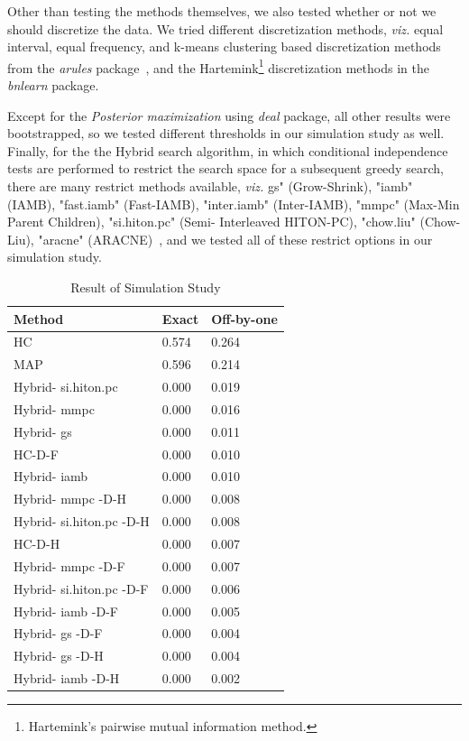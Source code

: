 \documentclass[smallextended]{svjour3}       %
\begin{document}
Other than testing the methods themselves, we also tested whether or not we should 
discretize the data. We tried different discretization methods, \textit{viz.} 
equal interval, equal frequency, and
k-means clustering based discretization methods from the
\textit{arules} package~\cite{arulesR}, and the 
Hartemink\footnote{Hartemink's pairwise mutual information 
method\cite{hartemink2001principled}.} discretization methods 
in the \textit{bnlearn} package.

Except for the \textit{Posterior maximization} using \textit{deal} package, 
all other results were bootstrapped, so we tested different thresholds in our 
simulation study as well. Finally, for the the Hybrid search algorithm, in which
conditional independence tests are performed to restrict
the search space for a subsequent greedy search, there are many restrict methods
available, \textit{viz.} gs" (Grow-Shrink), "iamb" (IAMB), "fast.iamb" (Fast-IAMB), "inter.iamb" (Inter-IAMB), "mmpc" (Max-Min Parent Children), "si.hiton.pc" (Semi- Interleaved HITON-PC), "chow.liu" (Chow-Liu), "aracne" (ARACNE)~\cite{bnlearnR}, and we tested all of these restrict options 
in our simulation study. 

\begin{table}
\caption{Result of Simulation Study}\label{t:sim_result}
\begin{tabular}{lll}
\hline
\textbf{Method} & \textbf{Exact} & \textbf{Off-by-one} \\ \hline
HC & 0.574 & 0.264 \\
MAP & 0.596 & 0.214 \\
Hybrid- si.hiton.pc & 0.000 & 0.019 \\
Hybrid- mmpc & 0.000 & 0.016 \\
Hybrid- gs & 0.000 & 0.011 \\
HC-D-F & 0.000 & 0.010 \\
Hybrid- iamb & 0.000 & 0.010 \\
Hybrid- mmpc -D-H & 0.000 & 0.008 \\
Hybrid- si.hiton.pc -D-H & 0.000 & 0.008 \\
HC-D-H & 0.000 & 0.007 \\
Hybrid- mmpc -D-F & 0.000 & 0.007 \\
Hybrid- si.hiton.pc -D-F & 0.000 & 0.006 \\
Hybrid- iamb -D-F & 0.000 & 0.005 \\
Hybrid- gs -D-F & 0.000 & 0.004 \\
Hybrid- gs -D-H & 0.000 & 0.004 \\
Hybrid- iamb -D-H & 0.000 & 0.002\\\hline
\end{tabular}
\end{table}
\end{document}
